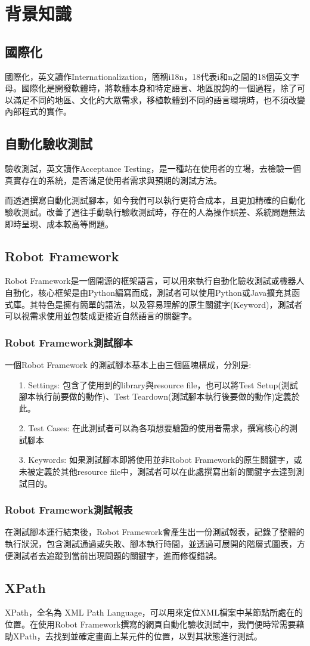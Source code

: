 \chapter{背景知識}

\section{國際化}
國際化\cite{internationalization}，英文讀作Internationalization，簡稱i18n，18代表i和n之間的18個英文字母。國際化是開發軟體時，將軟體本身和特定語言、地區脫鉤的一個過程，除了可以滿足不同的地區、文化的大眾需求，移植軟體到不同的語言環境時，也不須改變內部程式的實作。

\section{自動化驗收測試}
驗收測試\cite{se}，英文讀作Acceptance Testing，是一種站在使用者的立場，去檢驗一個真實存在的系統，是否滿足使用者需求與預期的測試方法。

而透過撰寫自動化測試腳本\cite{AT}，如今我們可以執行更符合成本，且更加精確的自動化驗收測試。改善了過往手動執行驗收測試時，存在的人為操作誤差、系統問題無法即時呈現、成本較高等問題。
\section{Robot Framework}
Robot Framework\cite{rf}\cite{rfguide}是一個開源的框架語言，可以用來執行自動化驗收測試或機器人自動化，核心框架是由Python\cite{python}編寫而成，測試者可以使用Python或Java擴充其函式庫。其特色是擁有簡單的語法，以及容易理解的原生關鍵字(Keyword)，測試者可以視需求使用並包裝成更接近自然語言的關鍵字。

\subsection{Robot Framework測試腳本}
一個Robot Framework 的測試腳本基本上由三個區塊構成，分別是:
\begin{itemize}
    \item[1.]Settings: 包含了使用到的library與resource file，也可以將Test Setup(測試腳本執行前要做的動作)、Test Teardown(測試腳本執行後要做的動作)定義於此。
    \item[2.]Test Cases: 在此測試者可以為各項想要驗證的使用者需求，撰寫核心的測試腳本
    \item[3.]Keywords: 如果測試腳本即將使用並非Robot Framework的原生關鍵字，或未被定義於其他resource file中，測試者可以在此處撰寫出新的關鍵字去達到測試目的。
\end{itemize}

\subsection{Robot Framework測試報表}
在測試腳本運行結束後，Robot Framework會產生出一份測試報表，記錄了整體的執行狀況，包含測試通過或失敗、腳本執行時間，並透過可展開的階層式圖表，方便測試者去追蹤到當前出現問題的關鍵字，進而修復錯誤。

\section{XPath}
XPath\cite{xpath}，全名為 XML Path Language，可以用來定位XML檔案中某節點所處在的位置。在使用Robot Framework撰寫的網頁自動化驗收測試中，我們便時常需要藉助XPath，去找到並確定畫面上某元件的位置，以對其狀態進行測試。